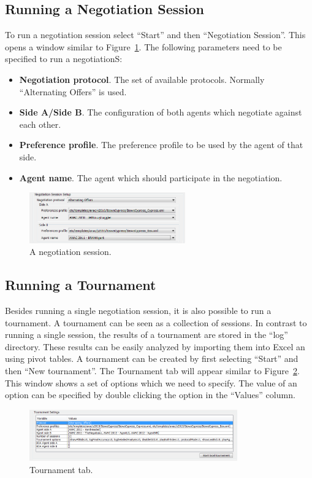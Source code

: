 \documentclass[]{article}
\begin{document}
\subsection{Running a Negotiation Session}
To run a negotiation session select ``Start'' and then ``Negotiation Session''. This opens a window similar to Figure~\ref{Fig:session}. The following parameters need to be specified to run a negotiationS:
\begin{itemize}
	\item \textbf{Negotiation protocol}. The set of available protocols. Normally ``Alternating Offers'' is used.
	\item \textbf{Side A/Side B}. The configuration of both agents which negotiate against each other.
	\item \textbf{Preference profile}. The preference profile to be used by the agent of that side.
	\item \textbf{Agent name}. The agent which should participate in the negotiation.
\end{itemize}

\begin{figure}[htb]
	\centering
	\includegraphics[width=0.6\textwidth]{media/image11.png}
\caption{A negotiation session.}\label{Fig:session}
\end{figure}


\subsection{Running a Tournament}
Besides running a single negotiation session, it is also possible to run a tournament. A tournament can be seen as a collection of sessions. In contrast to running a single session, the results of a tournament are stored in the ``log'' directory. These results can be easily analyzed by importing them into Excel an using pivot tables. A tournament can be created by first selecting ``Start'' and then ``New tournament''. The Tournament tab will appear similar to Figure~\ref{Fig:tournament}. This window shows a set of options which we need to specify. The value of an option can be specified by double clicking the option in the ``Values'' column.


\begin{figure}[htb]
	\centering
	\includegraphics[width=0.8\textwidth]{media/image16.png}
\caption{Tournament tab.}\label{Fig:tournament}
\end{figure}
\end{document}
